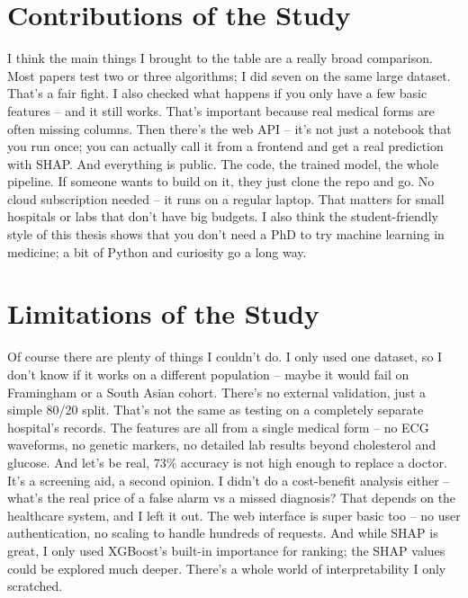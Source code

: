 \documentclass[12pt, a4paper, oneside]{book}
\begin{document}
\section{Contributions of the Study}
I think the main things I brought to the table are a really broad comparison. Most papers test two or three algorithms; I did seven on the same large dataset. That's a fair fight. I also checked what happens if you only have a few basic features -- and it still works. That's important because real medical forms are often missing columns. Then there's the web API -- it's not just a notebook that you run once; you can actually call it from a frontend and get a real prediction with SHAP. And everything is public. The code, the trained model, the whole pipeline. If someone wants to build on it, they just clone the repo and go. No cloud subscription needed -- it runs on a regular laptop. That matters for small hospitals or labs that don't have big budgets. I also think the student-friendly style of this thesis shows that you don't need a PhD to try machine learning in medicine; a bit of Python and curiosity go a long way.

\section{Limitations of the Study}
Of course there are plenty of things I couldn't do. I only used one dataset, so I don't know if it works on a different population -- maybe it would fail on Framingham or a South Asian cohort. There's no external validation, just a simple 80/20 split. That's not the same as testing on a completely separate hospital's records. The features are all from a single medical form -- no ECG waveforms, no genetic markers, no detailed lab results beyond cholesterol and glucose. And let's be real, 73\% accuracy is not high enough to replace a doctor. It's a screening aid, a second opinion. I didn't do a cost-benefit analysis either -- what's the real price of a false alarm vs a missed diagnosis? That depends on the healthcare system, and I left it out. The web interface is super basic too -- no user authentication, no scaling to handle hundreds of requests. And while SHAP is great, I only used XGBoost's built-in importance for ranking; the SHAP values could be explored much deeper. There's a whole world of interpretability I only scratched.
\end{document}

